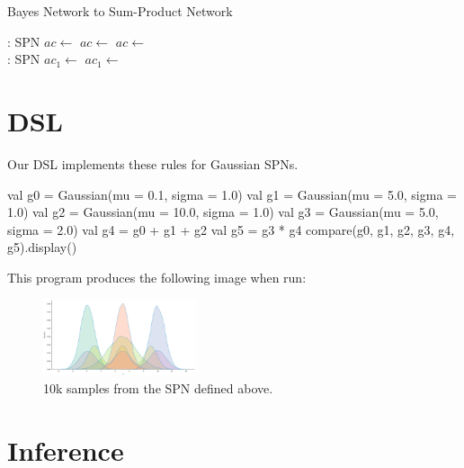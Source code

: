 \documentclass{article}
\begin{document}
\begin{algorithm}[H]
\caption{Bayes Network to Sum-Product Network}
\begin{algorithmic}[1]
: SPN
\State $ac \leftarrow $
\State $ac \leftarrow $
\State $ac \leftarrow $
\State {}
\EndProcedure\\
: SPN
\State $ac_1 \leftarrow $ 
\State $ac_1 \leftarrow $ 
\State {}
\Else
\State {}
\EndIf
\EndProcedure
\end{algorithmic}
\end{algorithm}

\section{DSL}

Our DSL implements these rules for Gaussian SPNs.

\begin{kotlinlisting}
val g0 = Gaussian(mu = 0.1,  sigma = 1.0)
val g1 = Gaussian(mu = 5.0,  sigma = 1.0)
val g2 = Gaussian(mu = 10.0, sigma = 1.0)
val g3 = Gaussian(mu = 5.0,  sigma = 2.0)
val g4 = g0 + g1 + g2
val g5 = g3 * g4
compare(g0, g1, g2, g3, g4, g5).display()
\end{kotlinlisting}

This program produces the following image when run:

\begin{figure}[h]
    \includegraphics[width=0.4\textwidth]{plot.png}
    \centering
    \caption{10k samples from the SPN defined above.}
\end{figure}



\section{Inference}
\end{document}
